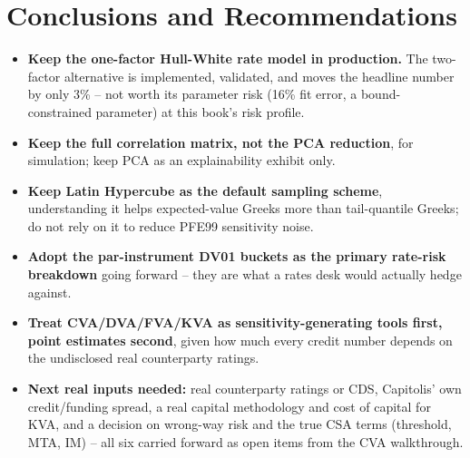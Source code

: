 \documentclass[10pt,letterpaper]{article}
\begin{document}
\section{Conclusions and Recommendations}
\begin{itemize}
\item \textbf{Keep the one-factor Hull-White rate model in production.} The two-factor alternative is implemented, validated, and moves the headline number by only 3\% -- not worth its parameter risk (16\% fit error, a bound-constrained parameter) at this book's risk profile.
\item \textbf{Keep the full correlation matrix, not the PCA reduction}, for simulation; keep PCA as an explainability exhibit only.
\item \textbf{Keep Latin Hypercube as the default sampling scheme}, understanding it helps expected-value Greeks more than tail-quantile Greeks; do not rely on it to reduce PFE99 sensitivity noise.
\item \textbf{Adopt the par-instrument DV01 buckets as the primary rate-risk breakdown} going forward -- they are what a rates desk would actually hedge against.
\item \textbf{Treat CVA/DVA/FVA/KVA as sensitivity-generating tools first, point estimates second}, given how much every credit number depends on the undisclosed real counterparty ratings.
\item \textbf{Next real inputs needed:} real counterparty ratings or CDS, Capitolis' own credit/funding spread, a real capital methodology and cost of capital for KVA, and a decision on wrong-way risk and the true CSA terms (threshold, MTA, IM) -- all six carried forward as open items from the CVA walkthrough.
\end{itemize}
\end{document}
